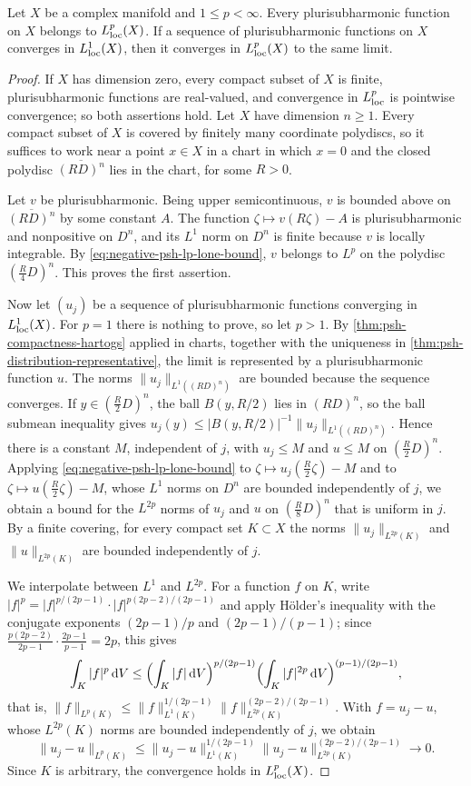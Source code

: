 \begin{theorem}\label{thm:psh-local-lp-integrability}
Let $X$ be a complex manifold and $1\leq p<\infty$. Every plurisubharmonic function on $X$ belongs to $L^p_{\mathrm{loc}}(X)$. If a sequence of plurisubharmonic functions on $X$ converges in $L^1_{\mathrm{loc}}(X)$, then it converges in $L^p_{\mathrm{loc}}(X)$ to the same limit.
\end{theorem}
\begin{proof}
If $X$ has dimension zero, every compact subset of $X$ is finite, plurisubharmonic functions are real-valued, and convergence in $L^p_{\mathrm{loc}}$ is pointwise convergence; so both assertions hold. Let $X$ have dimension $n\geq1$. Every compact subset of $X$ is covered by finitely many coordinate polydiscs, so it suffices to work near a point $x\in X$ in a chart in which $x=0$ and the closed polydisc $\overline{(RD)^n}$ lies in the chart, for some $R>0$.

Let $v$ be plurisubharmonic. Being upper semicontinuous, $v$ is bounded above on $\overline{(RD)^n}$ by some constant $A$. The function $\zeta\mapsto v(R\zeta)-A$ is plurisubharmonic and nonpositive on $D^n$, and its $L^1$ norm on $D^n$ is finite because $v$ is locally integrable. By \eqref{eq:negative-psh-lp-lone-bound}, $v$ belongs to $L^p$ on the polydisc $(\tfrac R4D)^n$. This proves the first assertion.

Now let $(u_j)$ be a sequence of plurisubharmonic functions converging in $L^1_{\mathrm{loc}}(X)$. For $p=1$ there is nothing to prove, so let $p>1$. By \cref{thm:psh-compactness-hartogs} applied in charts, together with the uniqueness in \cref{thm:psh-distribution-representative}, the limit is represented by a plurisubharmonic function $u$. The norms $\|u_j\|_{L^1((RD)^n)}$ are bounded because the sequence converges. If $y\in(\tfrac R2D)^n$, the ball $B(y,R/2)$ lies in $(RD)^n$, so the ball submean inequality gives $u_j(y)\leq|B(y,R/2)|^{-1}\|u_j\|_{L^1((RD)^n)}$. Hence there is a constant $M$, independent of $j$, with $u_j\leq M$ and $u\leq M$ on $(\tfrac R2D)^n$. Applying \eqref{eq:negative-psh-lp-lone-bound} to $\zeta\mapsto u_j(\tfrac R2\zeta)-M$ and to $\zeta\mapsto u(\tfrac R2\zeta)-M$, whose $L^1$ norms on $D^n$ are bounded independently of $j$, we obtain a bound for the $L^{2p}$ norms of $u_j$ and $u$ on $(\tfrac R8D)^n$ that is uniform in $j$. By a finite covering, for every compact set $K\subset X$ the norms $\|u_j\|_{L^{2p}(K)}$ and $\|u\|_{L^{2p}(K)}$ are bounded independently of $j$.

We interpolate between $L^1$ and $L^{2p}$. For a function $f$ on $K$, write $|f|^p=|f|^{p/(2p-1)}\cdot|f|^{p(2p-2)/(2p-1)}$ and apply H\"older's inequality with the conjugate exponents $(2p-1)/p$ and $(2p-1)/(p-1)$; since $\frac{p(2p-2)}{2p-1}\cdot\frac{2p-1}{p-1}=2p$, this gives
\[
 \int_K|f|^p\,\mathrm dV\leq\Bigl(\int_K|f|\,\mathrm dV\Bigr)^{p/(2p-1)}\Bigl(\int_K|f|^{2p}\,\mathrm dV\Bigr)^{(p-1)/(2p-1)},
\]
that is, $\|f\|_{L^p(K)}\leq\|f\|_{L^1(K)}^{1/(2p-1)}\|f\|_{L^{2p}(K)}^{(2p-2)/(2p-1)}$. With $f=u_j-u$, whose $L^{2p}(K)$ norms are bounded independently of $j$, we obtain
\[
 \|u_j-u\|_{L^p(K)}
 \leq\|u_j-u\|_{L^1(K)}^{1/(2p-1)}
       \|u_j-u\|_{L^{2p}(K)}^{(2p-2)/(2p-1)}\longrightarrow0.
\]
Since $K$ is arbitrary, the convergence holds in $L^p_{\mathrm{loc}}(X)$.
\end{proof}
